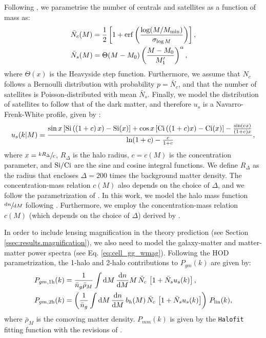 \documentclass[a4paper,11pt]{article}
\begin{document}
    Following \cite{2011ApJ...736...59Z}, we parametrise the number of centrals and satellites as a function of mass as:
    \begin{align}
      &\bar{N}_c(M)=\frac{1}{2}\left[1+{\rm erf}\left(\frac{\log(M/M_{\rm min})}{\sigma_{\log M}}\right)\right],\\
      &\bar{N}_s(M)=\Theta(M-M_0)\left(\frac{M-M_0}{M_1'}\right)^\alpha,
    \end{align}
    where $\Theta(x)$ is the Heavyside step function. Furthermore, we assume that $N_c$ follows a Bernoulli distribution with probability $p=\bar{N}_c$, and that the number of satellites is Poisson-distributed with mean $\bar{N}_s$. Finally, we model the distribution of satellites to follow that of the dark matter, and therefore $u_s$ is a Navarro-Frenk-White profile, given by \cite{Navarro:1996}:
    \begin{equation}
      u_s(k|M)=\frac{\sin x\left[{\rm Si}\left((1+c)\,x\right)-{\rm Si}(x)\right]+\cos x\left[{\rm Ci}\left((1+c)x\right)-{\rm Ci}(x)\right]-\frac{\sin(cx)}{(1+c)x}}{{\rm ln}(1+c)-\frac{c}{1+c}},
    \end{equation}
    where $x=\sfrac{k R_\Delta}{c}$, $R_\Delta$ is the halo radius, $c=c(M)$ is the concentration parameter, and ${\rm Si}/{\rm Ci}$ are the sine and cosine integral functions. We define $R_\Delta$ as the radius that encloses $\Delta=200$ times the background matter density. The concentration-mass relation $c(M)$ also depends on the choice of $\Delta$, and we follow the parametrization of \cite{Duffy:2008}. In this work, we model the halo mass function $\sfrac{\mathrm{d}n}{\mathrm{d}M}$ following \cite{Tinker:2010}. Furthermore, we employ the concentration-mass relation $c(M)$ (which depends on the choice of $\Delta$) derived by \cite{Duffy:2008}.

    In order to include lensing magnification in the theory prediction (see Section \ref{ssec:results.magnification}), we also need to model the galaxy-matter and matter-matter power spectra (see Eq. \ref{eq:cell_gg_wmag}). Following the HOD parametrization, the 1-halo and 2-halo contributions to $P_{gm}(k)$ are given by:
    \begin{align}
      & P_{gm,{\rm 1h}}(k)=\frac{1}{\bar{n}_g\bar{\rho}_M} \int \mathrm{d}M\,\frac{\mathrm{d}n}{\mathrm{d}M} M\,\bar{N}_c\,\left[1+\bar{N}_su_s(k)\right],\\
      & P_{gm,{\rm 2h}}(k)=\left(\frac{1}{\bar{n}_g} \int \mathrm{d}M\,\frac{\mathrm{d}n}{\mathrm{d}M}\,b_h(M)\,\bar{N}_c\,\left[1+\bar{N}_su_s(k)\right]\right)\,P_{\rm lin}(k),
    \end{align}
    where $\bar{\rho}_M$ is the comoving matter density. $P_{mm}(k)$ is given by the {\tt Halofit} fitting function \cite{Smith:2003} with the revisions of \cite{Takahashi:2012}.
\end{document}
